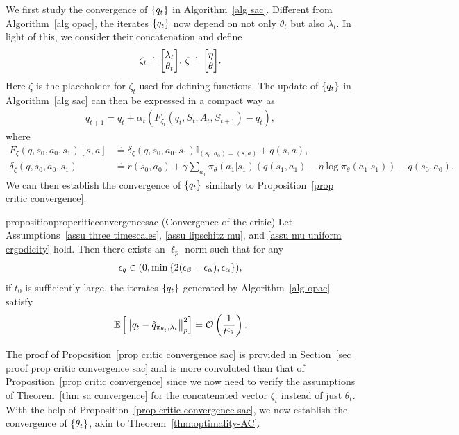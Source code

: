 \documentclass[twoside,11pt]{article}
\newcommand{\fO}{\mathcal{O}}
\newcommand{\E}{\mathbb{E}}
\numberwithin{assucounter}{section}
\begin{document}
We first study the convergence of $\qty{q_t}$ in Algorithm~\ref{alg sac}.
Different from Algorithm~\ref{alg opac},
the iterates $\qty{q_t}$ now depend on not only $\theta_t$ but also $\lambda_t$.
In light of this,
we consider their concatenation and
define 
\begin{align}
  \zeta_t \doteq \mqty[\lambda_t \\ \theta_t], \, \zeta \doteq \mqty[\eta \\ \theta].
\end{align}
Here $\zeta$ is the placeholder for $\zeta_t$ used for defining functions. 
The update of $\qty{q_t}$ in Algorithm~\ref{alg sac} can then be expressed in a compact way as
\begin{align}
  q_{t+1} = q_t + \alpha_t (F_{\zeta_t}(q_t, S_t, A_t, S_{t+1}) - q_t),
\end{align}
where
\begin{align}
  F_\zeta(q, s_0, a_0, s_1)[s, a] &\doteq  \delta_\zeta(q, s_0, a_0, s_1) \mathbb{I}_{(s_0, a_0) = (s, a)} + q(s, a), \\
  \delta_\zeta(q, s_0, a_0, s_1) &\doteq r(s_0, a_0) + \gamma \sum_{a_1} \pi_{\theta}(a_1 | s_1) \left(q(s_1, a_1) - \eta \log \pi_\theta(a_1 | s_1)\right) - q(s_0, a_0).
\end{align}
We can then establish the convergence of $\qty{q_t}$ similarly to Proposition~\ref{prop critic convergence}.
\begin{restatable}{proposition}{propcriticconvergencesac}
  \label{prop critic convergence sac}
  (Convergence of the critic)
  Let Assumptions~\ref{assu three timescales}, \ref{assu lipschitz mu}, and \ref{assu mu uniform ergodicity} hold.
  Then there exists an $\ell_p$ norm such that
  for any
  \begin{align}
    \epsilon_q \in (0, \min\qty{2(\epsilon_\beta - \epsilon_\alpha), \epsilon_\alpha}),
  \end{align}
  if $t_0$ is sufficiently large,
  the iterates $\qty{q_t}$ generated by Algorithm~\ref{alg opac} satisfy
  \begin{align}
    \E\left[\norm{q_t - \tilde q_{\pi_{\theta_t}, \lambda_t}}^2_p\right] = \fO\left(\frac{1}{t^{\epsilon_q}}\right).
  \end{align}
\end{restatable}
\noindent The proof of Proposition~\ref{prop critic convergence sac} is provided in Section~\ref{sec proof prop critic convergence sac} and is more convoluted than that of Proposition~\ref{prop critic convergence} 
since we now need to verify 
the assumptions of Theorem~\ref{thm sa convergence} for the concatenated vector $\zeta_t$ instead of just $\theta_t$.
With the help of Proposition~\ref{prop critic convergence sac},
we now establish the 
convergence of $\qty{\theta_t}$,
akin to Theorem~\ref{thm:optimality-AC}.
\end{document}
